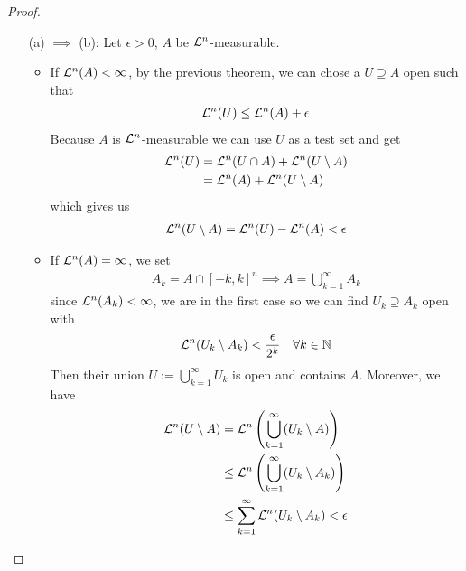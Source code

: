 \begin{proof}
  \phantom{a}
\begin{enumerate}
  \item[(a) $\implies$ (b):] Let $\epsilon >0$, $A$ be $\mathcal{L}^{n}$-measurable.

    \begin{itemize}
      \item If $\mathcal{L}^{n}(A) < \infty$, by the previous theorem, we can chose a $U \supseteq A$ open such that
        \begin{align*}
          \Leb^{n}(U) \leq \Leb^{n}(A) + \epsilon
        \end{align*}
        Because $A$ is $\mathcal{L}^{n}$-measurable we can use $U$ as a test set and get
        \begin{align*}
          \mathcal{L}^{n}(U) &= \mathcal{L}^{n}(U \cap A) + \mathcal{L}^{n}(U \setminus A)\\
                      &= \mathcal{L}^{n}(A) + \mathcal{L}^{n}(U \setminus A)
        \end{align*}
        which gives us
        \begin{align*}
          \Leb^{n}(U \setminus A) = \Leb^{n}(U) - \Leb^{n}(A) < \epsilon
        \end{align*}

      \item If $\mathcal{L}^{n}(A) = \infty$, we set
        \begin{align*}
          A_k = A \cap [-k,k]^{n} \implies A = \bigcup_{k=1}^{\infty}A_k
        \end{align*}
        since $\mathcal{L}^{n}(A_k) < \infty$, we are in the first case so we can find $U_k \supseteq A_k$ open with
        \begin{align*}
          \Leb^{n}(U_k \setminus A_k) < \frac{\epsilon}{2^{k}} \quad \forall k \in \N
        \end{align*}
        Then their union $U := \bigcup_{k=1}^{\infty}U_k$ is open and contains $A$.
        Moreover, we have
        \begin{align*}
          \Leb^{n}(U \setminus A) 
          &= \Leb^{n} \left(
            \bigcup_{k=1}^{\infty}(U_k \setminus A)
          \right)\\
          &\leq
          \Leb^{n} \left(
            \bigcup_{k=1}^{\infty}(U_k \setminus A_k)
          \right)\\
          &\leq \sum_{k=1}^{\infty} \Leb^{n}(U_k \setminus A_k) < \epsilon
        \end{align*}
    \end{itemize}




\end{enumerate}
\end{proof}
